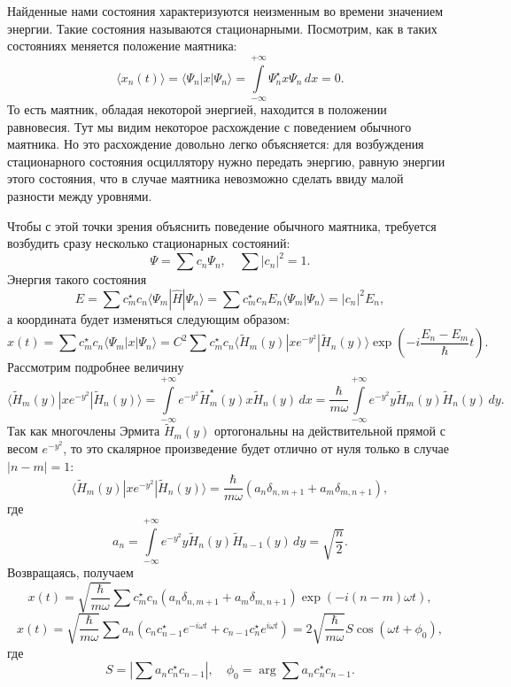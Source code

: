 \documentclass{ncc}
\begin{document}
Найденные нами состояния характеризуются неизменным во времени значением энергии. Такие состояния называются стационарными. Посмотрим, как в таких состояниях меняется положение маятника:
\[
    \langle x_n(t) \rangle = \langle \Psi_n | x | \Psi_n \rangle = \int\limits_{-\infty}^{+\infty}
    \Psi_n^\star  x \Psi_n\, dx = 0.
\]
То есть маятник, обладая некоторой энергией, находится в положении равновесия. Тут мы видим некоторое расхождение с поведением обычного маятника. Но это расхождение довольно легко объясняется: для возбуждения стационарного состояния осциллятору нужно передать энергию, равную энергии этого состояния, что в случае маятника невозможно сделать ввиду малой разности между уровнями.

Чтобы с этой точки зрения объяснить поведение обычного маятника, требуется возбудить сразу несколько стационарных состояний:
\[
    \Psi = \sum c_n \Psi_n,\quad \sum |c_n|^2 = 1.
\]
Энергия такого состояния
\[
    E = \sum c_m^\star c_n \langle\Psi_m|\hat{H}|\Psi_n\rangle = \sum c_m^\star c_n E_n\langle\Psi_m|\Psi_n\rangle = |c_n|^2 E_n,
\]
а координата будет изменяться следующим образом:
\[
    x(t) = \sum c_m^\star c_n \langle\Psi_m|x|\Psi_n\rangle = C^2\sum c_m^\star c_n \langle \tilde{H}_m(y) | x e^{-y^2} | \tilde{H}_n(y)\rangle \exp\left(-i\frac{E_n-E_m}{\hbar}t\right).
\]
Рассмотрим подробнее величину
\[
    \langle \tilde{H}_m(y) | xe^{-y^2} | \tilde{H}_n(y)\rangle = \int\limits_{-\infty}^{+\infty} e^{-y^2}\tilde{H}_m^\star (y) x \tilde{H}_n(y)\, dx = \frac{\hbar}{m\omega} \int\limits_{-\infty}^{+\infty} e^{-y^2} y \tilde{H}_m(y) \tilde{H}_n(y)\, dy.
\]
Так как многочлены Эрмита \( \tilde{H}_m(y) \) ортогональны на действительной прямой с весом \( e^{-y^2} \), то это скалярное произведение будет отлично от нуля только в случае \( |n - m| = 1 \):
\[
    \langle \tilde{H}_m(y) | xe^{-y^2} | \tilde{H}_n(y)\rangle =
    \frac{\hbar}{m\omega}(a_n\delta_{n, m+1} + a_m\delta_{m, n+1}),
\]
где
\[
    a_n = \int\limits_{-\infty}^{+\infty} e^{-y^2} y \tilde{H}_n(y) \tilde{H}_{n-1}(y)\, dy = \sqrt{\frac{n}{2}}.
\]
Возвращаясь, получаем
\[
    x(t) = \sqrt{\frac{\hbar}{m\omega}}\sum c_m^\star c_n (a_n\delta_{n, m+1} + a_m\delta_{m, n+1}) \exp(-i(n-m)\omega t),
\]
\[
    x(t) = \sqrt{\frac{\hbar}{m\omega}}\sum  a_n (c_n c_{n-1}^\star  e^{-i\omega t}+ c_{n-1} c_n^\star  e^{i\omega t}) = 
    2\sqrt{\frac{\hbar}{m\omega}}S  \cos(\omega t + \phi_0),
\]
где
\[
    S = \left|\sum a_n c_n^\star  c_{n-1}\right|,\quad
    \phi_0 = \arg \sum a_n c_n^\star  c_{n-1}.
\]
\end{document}
